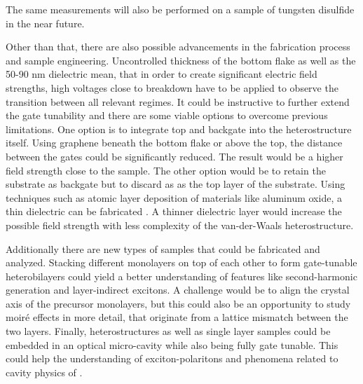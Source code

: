 The same measurements will also be performed on a sample of tungsten disulfide in the near future.

Other than that, there are also possible advancements in the fabrication process and sample engineering. Uncontrolled thickness of the bottom \hbng flake as well as the 50-90 nm \sio dielectric mean, that in order to create significant electric field strengths, high voltages close to breakdown have to be applied to observe the transition between all relevant regimes. It could be instructive to further extend the gate tunability and there are some viable options to overcome previous limitations. One option is to integrate top and backgate into the heterostructure itself. Using graphene beneath the bottom \hbng flake or above the top, the distance between the gates could be significantly reduced. The result would be a higher field strength close to the sample. The other option would be to retain the substrate as backgate but to discard \sio as as the top layer of the substrate. Using techniques such as atomic layer deposition of materials like aluminum oxide, a thin dielectric can be fabricated \cite{jandhyala_atomic_2012}. A thinner dielectric layer would increase the possible field strength with less complexity of the van-der-Waals heterostructure.

Additionally there are new types of samples that could be fabricated and analyzed. Stacking different \tmdg monolayers on top of each other to form gate-tunable heterobilayers could yield a better understanding of features like second-harmonic generation and layer-indirect excitons. A challenge would be to align the crystal axis of the precursor monolayers, but this could also be an opportunity to study moiré effects in more detail, that originate from a lattice mismatch between the two layers.
Finally, heterostructures as well as single layer samples could be embedded in an optical micro-cavity while also being fully gate tunable. This could help the understanding of exciton-polaritons and phenomena related to cavity physics of \tmds.